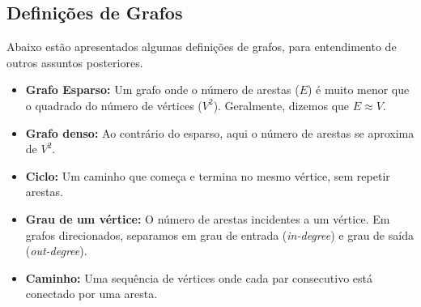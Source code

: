\FloatBarrier %

\subsection{Definições de Grafos}

Abaixo estão apresentados algumas definições de grafos, para entendimento de
outros assuntos posteriores.

\begin{itemize}[leftmargin=3.0cm, align=left]
	\item \textbf{Grafo Esparso:} Um grafo onde o número de arestas ($E$) é muito menor que o quadrado do número de vértices ($V^2$). Geralmente, dizemos que $E \approx V$.
	\item \textbf{Grafo denso:} Ao contrário do esparso, aqui o número de arestas se aproxima de $V^2$.
	\item \textbf{Ciclo:} Um caminho que começa e termina no mesmo vértice, sem repetir arestas.
	\item \textbf{Grau de um vértice:} O número de arestas incidentes a um vértice. Em grafos direcionados, separamos em grau de entrada (\textit{in-degree}) e grau de saída (\textit{out-degree}).
	\item \textbf{Caminho:} Uma sequência de vértices onde cada par consecutivo está conectado por uma aresta.
\end{itemize}

